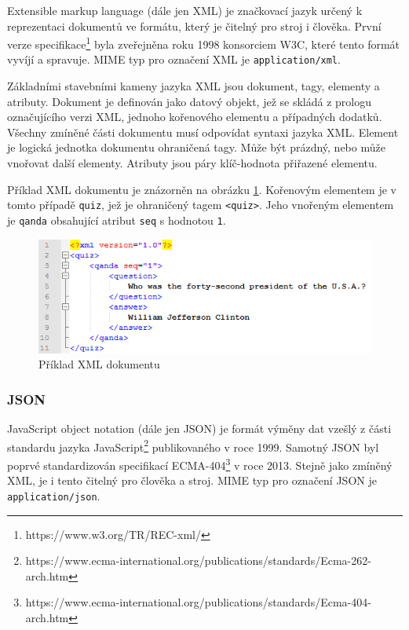 \documentclass[czech,DP]{thesiskiv}
\begin{document}
Extensible markup language (dále jen XML) je značkovací jazyk určený k reprezentaci dokumentů ve formátu, který je čitelný pro stroj i člověka. První verze specifikace\footnote{https://www.w3.org/TR/REC-xml/} byla zveřejněna roku 1998 konsorciem W3C, které tento formát vyvíjí a spravuje. MIME typ pro označení XML je \verb|application/xml|.

Základními stavebními kameny jazyka XML jsou dokument, tagy, elementy a atributy. Dokument je definován jako datový objekt, jež se skládá z prologu označujícího verzi XML, jednoho kořenového elementu a případných dodatků. Všechny zmíněné části dokumentu musí odpovídat syntaxi jazyka XML. Element je logická jednotka dokumentu ohraničená tagy. Může být prázdný, nebo může vnořovat další elementy. Atributy jsou páry klíč-hodnota přiřazené elementu.

Příklad XML dokumentu je znázorněn na obrázku \ref{fig:xml-example}. Kořenovým elementem je v tomto případě \verb|quiz|, jež je ohraničený tagem \verb|<quiz>|. Jeho vnořeným elementem je \verb|qanda| obsahující atribut \verb|seq| s hodnotou \verb|1|.

\begin{figure}[h]
	\centering
	\includegraphics[width=12.5cm]{xml-example.png}
	\caption{Příklad XML dokumentu}
	\label{fig:xml-example}
\end{figure} 

\subsubsection{JSON} 
JavaScript object notation (dále jen JSON) je formát výměny dat vzešlý z části standardu jazyka JavaScript\footnote{https://www.ecma-international.org/publications/standards/Ecma-262-arch.htm} publikovaného v roce 1999. Samotný JSON byl poprvé standardizován specifikací ECMA-404\footnote{https://www.ecma-international.org/publications/standards/Ecma-404-arch.htm} v roce 2013. Stejně jako zmíněný XML, je i tento čitelný pro člověka a stroj.  MIME typ pro označení JSON je \verb|application/json|.
\end{document}
